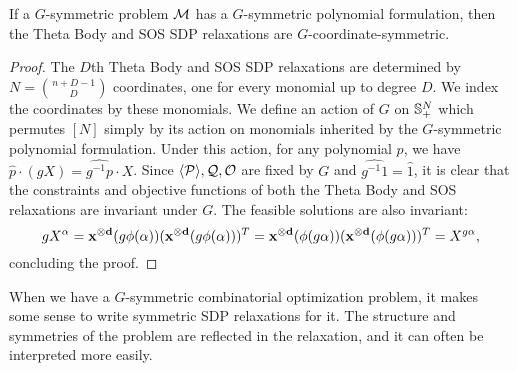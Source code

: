 \begin{lemma}
If a $G$-symmetric problem $\mathcal M$ has a $G$-symmetric polynomial formulation, then the Theta Body and SOS SDP relaxations are $G$-coordinate-symmetric.
\end{lemma}
\begin{proof}
The $D$th Theta Body and SOS SDP relaxations are determined by $N = \binom{n+D-1}{D}$ coordinates, one for every monomial up to degree $D$. We index the coordinates by these monomials. We define an action of $G$ on $\mathbb{S}^{N}_+$ which permutes $[N]$ simply by its action on monomials inherited by the $G$-symmetric polynomial formulation. Under this action, for any polynomial $p$, we have $\hat{p}\cdot (gX) = \widehat{g^{-1}p} \cdot X$. Since $\langle \mathcal P \rangle,\mathcal Q,\mathcal O$ are fixed by $G$ and $\widehat{g^{-1}1} = \hat{1}$, it is clear that the constraints and objective functions of both the Theta Body and SOS relaxations are invariant under $G$. The feasible solutions are also invariant:
\[gX^\alpha = \mathbf{x^{\otimes d}}(g\phi(\alpha))(\mathbf{x^{\otimes d}}(g\phi(\alpha)))^T = \mathbf{x^{\otimes d}}(\phi(g\alpha))(\mathbf{x^{\otimes d}}(\phi(g\alpha)))^T = X^{g\alpha},\]
concluding the proof.
\end{proof}

When we have a $G$-symmetric combinatorial optimization problem, it makes some sense to write symmetric SDP relaxations for it.
The structure and symmetries of the problem are reflected in the relaxation, and it can often be interpreted more easily.
